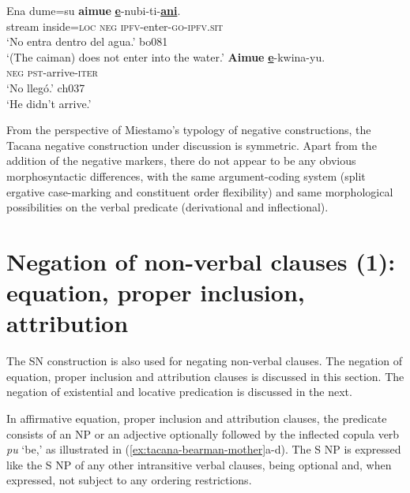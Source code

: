 \documentclass[output=paper]{langsci/langscibook}
\begin{document}
\begin{exe}\ex\label{ex:tacana-caiman-second}
\gll {\ob}Ena  dume=su{\cb}  \textbf{aimue}
\textbf{\uline{e}}-nubi-ti-\textbf{\uline{ani}}.\\
    stream  inside=\textsc{loc}  \textsc{neg}
    \textsc{ipfv}-enter-\textsc{go-ipfv.sit}\\
\glt `No entra dentro del agua.' bo081\\
`(The caiman) does not enter into the water.'
\ex\label{ex:tacana-arrive} 
\gll \textbf{Aimue}  \textbf{\uline{e}}-kwina-yu.\\
 \textsc{neg}  \textsc{pst}-arrive-\textsc{iter}\\
\glt `No llegó.' ch037\\ 
`He didn't arrive.'
\end{exe}

From the perspective of Miestamo's \parencites*{Miestamo2005}{Miestamo2007} typology of negative constructions, the Tacana negative construction under discussion is symmetric. Apart from the addition of the negative markers, there do not appear to be any obvious morphosyntactic differences, with the same argument-coding system (split ergative case-marking and constituent order flexibility) and same morphological possibilities on the verbal predicate (derivational and inflectional). 

\section{Negation of non-verbal clauses (1): equation, proper inclusion, attribution}
\label{sec:tacana-4}

The SN construction is also used for negating non-verbal clauses. The
negation of equation, proper inclusion and attribution clauses is discussed
in this section. The negation of existential and locative predication is discussed in the next.

In affirmative equation, proper inclusion and attribution clauses, the
predicate consists of an NP or an adjective optionally followed by
the inflected copula verb \textit{pu} `be,' as illustrated in
(\ref{ex:tacana-bearman-mother}a-d). The S NP is expressed like the S NP of any other intransitive verbal clauses, being optional and, when expressed, not subject to any ordering restrictions.
\end{document}
